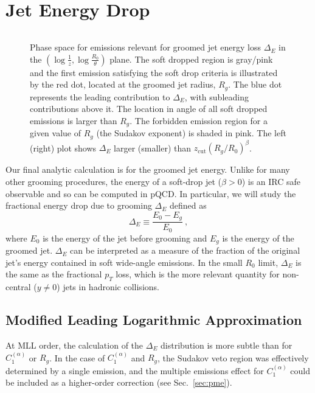 \documentclass[letterpaper,11pt]{article}
\newcommand{\C}[2]{C^{(#2)}_{#1}}
\newcommand{\zcut}{z_\text{cut}}
\newcommand{\ea}{{\C{1}{\alpha}}}
\DeclareRobustCommand{\Sec}[1]{Sec.~\ref{#1}}
\begin{document}
\section{Jet Energy Drop}
\label{sec:energy}


\begin{figure}
\begin{center}
$\quad$
\end{center}
\caption{Phase space for emissions relevant for groomed jet energy loss $\Delta_E$ in the $(\log \frac{1}{z},\log \frac{R_0}{\theta})$ plane.  The soft dropped region is gray/pink and the first emission satisfying the soft drop criteria is illustrated by the red dot, located at the groomed jet radius, $R_g$.  The blue dot represents the leading contribution to $\Delta_E$, with subleading contributions above it.  The location in angle of all soft dropped emissions is larger than $R_g$.  The forbidden emission region for a given value of $R_g$ (the Sudakov exponent) is shaded in pink.  The left (right) plot shows $\Delta_E$ larger (smaller) than $\zcut (R_g/R_0)^\beta$.
}
\label{fig:groomedregions-energy-loss}
\end{figure}

Our final analytic calculation is for the groomed jet energy.  Unlike for many other grooming procedures, the energy of a soft-drop jet ($\beta>0$) is an IRC safe observable and so can be computed in pQCD.  In particular, we will study the fractional energy drop due to grooming $\Delta_E$ defined as
\begin{equation}
\Delta_E \equiv \frac{E_0 - E_g}{E_0} \ ,
\end{equation}
where $E_0$ is the energy of the jet before grooming and $E_g$ is the energy of the groomed jet.  $\Delta_E$ can be interpreted as a measure of the fraction of the original jet's energy contained in soft wide-angle emissions.  In the small $R_0$ limit, $\Delta_E$ is the same as the fractional $p_T$ loss, which is the more relevant quantity for non-central ($y \not= 0$) jets in hadronic collisions.

\subsection{Modified Leading Logarithmic Approximation}
\label{sec:MLLenergy}

At MLL order, the calculation of the $\Delta_E$ distribution is more subtle than for $\ea$ or $R_g$.  In the case of $\ea$ and $R_g$, the Sudakov veto region was effectively determined by a single emission, and the multiple emissions effect for $\ea$ could be included as a higher-order correction (see \Sec{sec:pme}).  
\end{document}
